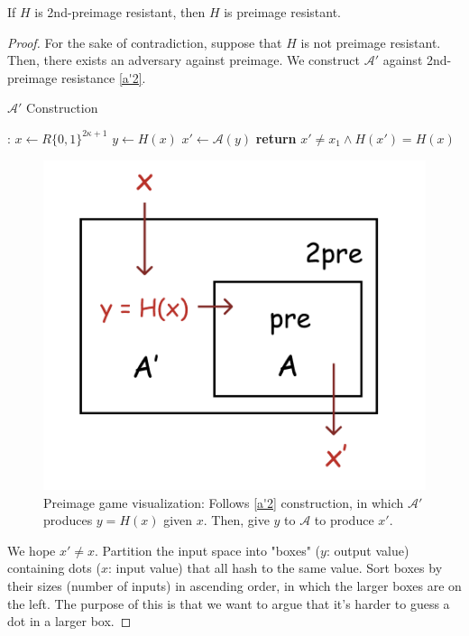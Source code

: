 \begin{theorem}
If $H$ is 2nd-preimage resistant, then $H$ is preimage resistant.
\end{theorem}

\begin{proof}
For the sake of contradiction, suppose that $H$ is not preimage resistant.  Then, there exists an  adversary against preimage. We construct $\mathcal{A}'$ against 2nd-preimage resistance \ref{a'2}.

\begin{algorithm}[H]
\caption{$\mathcal{A}'$ Construction}
\label{a'2}
\begin{algorithmic}[1]
:
    \State $x \leftarrow R \{0,1\}^{2\kappa+1}$
    \State $y \leftarrow H(x)$
    \State $x' \leftarrow \mathcal{A}(y)$
    \State \textbf{return} $x' \ne x_1 \wedge H(x')=H(x)$
\EndFunction
\end{algorithmic}
\end{algorithm}

\begin{figure}[H]
    \centering
    \includegraphics[scale=0.6]{figures/pre.png}
    \caption{Preimage game visualization: Follows \ref{a'2} construction, in which $\mathcal{A}'$ produces $y = H(x)$ given $x$. Then, give $y$ to $\mathcal{A}$ to produce $x'$.}
    \label{fig:pre_viz}
\end{figure}

We hope $x'\ne x$. Partition the input space into "boxes" ($y$: output value) containing dots ($x$: input value) that all hash to the same value. Sort boxes by their sizes (number of inputs) in ascending order, in which the larger boxes are on the left. The purpose of this is that we want to argue that it's harder to guess a dot in a larger box.


\end{proof}
